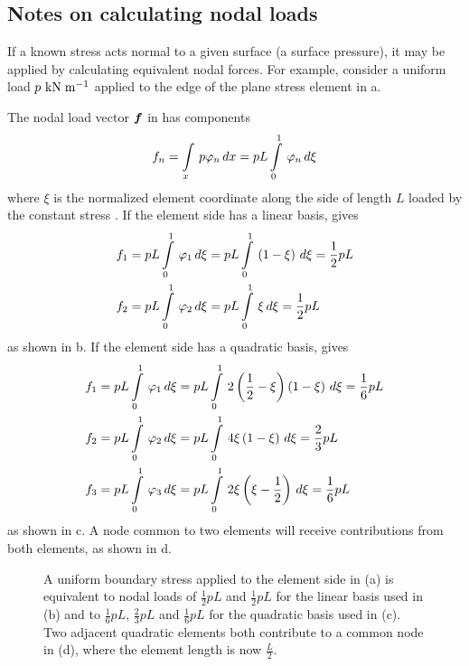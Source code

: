 \subsection{Notes on calculating nodal loads}
\label{sec:noteoncalc}

If a known stress acts normal to a given surface (\eg a surface pressure), it
may be applied by calculating equivalent nodal forces. For example, consider a
uniform load $ p~\mathrm{\mathrm{kN}\thickspace\mathrm{m}^{-1}} $ applied to the edge of the plane stress
element in a.

The nodal load vector $\vect{f}$ in  has components
\begin{equation}
  f_{n} =    \displaystyle\int\limits_{x}^{} \,p  \varphi_{n} \,dx   = pL   \displaystyle\int\limits_{0}^{1} \, \varphi_{n} \,d\xi 
  \label{eqn:nlv}
\end{equation}  
where $\xi$ is the normalized element coordinate along the side of length $L$
loaded by the constant stress . If the element side has a
linear basis,  gives
\begin{align*}
  f_{1} &= pL  \displaystyle\int\limits_{0}^{1} \, \varphi_{1} \,d\xi  = pL  \displaystyle\int\limits_{0}^{1} \,\left( 1-\xi \right)\,d\xi  =
  \dfrac{1}{2} pL \\
  f_{2} &= pL  \displaystyle\int\limits_{0}^{1} \, \varphi_{2} \,d\xi  = pL  \displaystyle\int\limits_{0}^{1} \,\xi\,d\xi  = \dfrac{1}{2} pL
\end{align*}
as shown in b. If the element side has a
quadratic basis,  gives 
\begin{align*}
  f_{1} &= pL  \displaystyle\int\limits_{0}^{1} \, \varphi_{1} \,d\xi  =
  pL  \displaystyle\int\limits_{0}^{1} \,2\left( \dfrac{1}{2}-\xi \right)\left( 1-\xi \right)\,d\xi  = \frac{1}{6} pL \\
  f_{2} &= pL  \displaystyle\int\limits_{0}^{1} \, \varphi_{2} \,d\xi  = pL   \displaystyle\int\limits_{0}^{1} \,4\xi\left( 1-\xi \right)\,d\xi   
  = \frac{2}{3} pL \\
  f_{3} &= pL  \displaystyle\int\limits_{0}^{1} \, \varphi_{3} \,d\xi  = pL   \displaystyle\int\limits_{0}^{1} \,2\xi\left( \xi -
      \dfrac{1}{2} \right)\,d\xi  = \frac{1}{6} pL
\end{align*}
as shown in c. A node common to two elements will
receive contributions from both elements, as shown in
d.

\begin{figure}[htbp] \centering
  
  \caption{A uniform boundary stress applied to the element side in (a) is 
   equivalent to nodal loads of $\frac{1}{2} pL$ and $\frac{1}{2} pL$ for the 
   linear basis used in (b) and to  $\frac{1}{6}pL$,  $\frac{2}{3}pL$ and  
   $\frac{1}{6}pL$ for the quadratic basis used in (c). Two adjacent quadratic
   elements both contribute to a common node in (d), where the element 
   length is now $\frac{L}{2}$.}
  \label{fig:uniformbound}
\end{figure}


